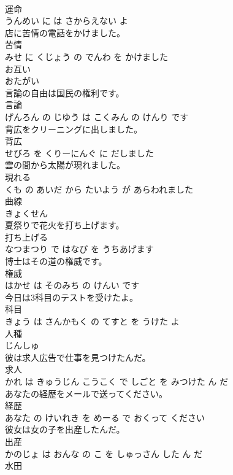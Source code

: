 \documentclass[8pt]{extreport}
\begin{document}
\begin{CJK}{UTF8}{min}
\\	運命 
\\	うんめい に は さからえない よ			
\\	店に苦情の電話をかけました。	
\\	苦情 
\\	みせ に くじょう の でんわ を かけました			
\\	お互い	
\\	おたがい		
\\	言論の自由は国民の権利です。	
\\	言論 
\\	げんろん の じゆう は こくみん の けんり です			
\\	背広をクリーニングに出しました。	
\\	背広 
\\	せびろ を くりーにんぐ に だしました			
\\	雲の間から太陽が現れました。	
\\	現れる 
\\	くも の あいだ から たいよう が あらわれました			
\\	曲線	
\\	きょくせん		
\\	夏祭りで花火を打ち上げます。	
\\	打ち上げる 
\\	なつまつり で はなび を うちあげます			
\\	博士はその道の権威です。	
\\	権威 
\\	はかせ は そのみち の けんい です			
\\	今日は3科目のテストを受けたよ。	
\\	科目 
\\	きょう は さんかもく の てすと を うけた よ			
\\	人種	
\\	じんしゅ		
\\	彼は求人広告で仕事を見つけたんだ。	
\\	求人 
\\	かれ は きゅうじん こうこく で しごと を みつけた ん だ			
\\	あなたの経歴をメールで送ってください。	
\\	経歴 
\\	あなた の けいれき を めーる で おくって ください			
\\	彼女は女の子を出産したんだ。	
\\	出産 
\\	かのじょ は おんな の こ を しゅっさん した ん だ			
\\	水田	

\end{CJK}
\end{document}
